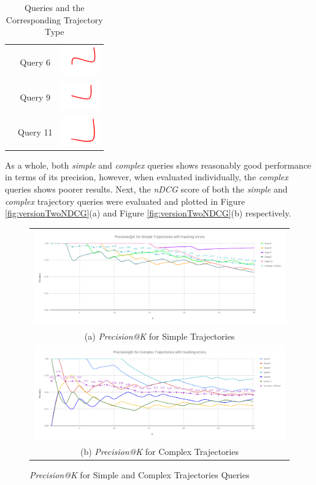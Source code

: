\begin{table}[!ht]
\begin{tabular}{|c|c|c|}
 & Query 6 & \includegraphics{image/minimaps/query_06.png} \\ \cline{2-3}
 & Query 9 & \includegraphics{image/minimaps/query_09.png} \\ \cline{2-3}
 & Query 11 & \includegraphics{image/minimaps/query_11.png} \\ \hline
\end{tabular}
\caption{Queries and the Corresponding Trajectory Type}
\label{table:versionTwoComplexSimple}
\end{table}

As a whole, both \textit{simple} and \textit{complex} queries shows reasonably good performance in terms of its precision, however, when evaluated individually, the \textit{complex} queries shows poorer results. Next, the \textit{nDCG} score of both the \textit{simple} and \textit{complex} trajectory queries were evaluated and plotted in Figure \ref{fig:versionTwoNDCG}(a) and Figure \ref{fig:versionTwoNDCG}(b) respectively.


\begin{figure}[htb!]
  \centering
\begin{tabular}{c}
 \includegraphics[width=0.9\linewidth]{image/retrievalTwo/p@k_simple.png}\\
 (a) \textit{Precision@K} for Simple Trajectories \\
 \includegraphics[width=0.9\linewidth]{image/retrievalTwo/p@k_complex.png} \\
 (b) \textit{Precision@K} for Complex Trajectories
\end{tabular}
\caption{\textit{Precision@K} for Simple and Complex Trajectories Queries} \label{fig:versionTwoPatKAll}
\end{figure}


